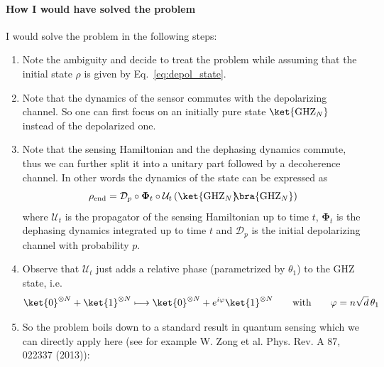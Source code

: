 {\paragraph*{How I would have solved the problem}

I would solve the problem in the following steps:
\begin{enumerate}
  \item Note the ambiguity and decide to treat the problem while assuming that the initial state $\rho$ is given by Eq.~\eqref{eq:depol_state}.
  
  \item Note that the dynamics of the sensor commutes with the depolarizing channel. So one can first focus on an initially pure state $\ket{\mathrm{GHZ}_N}$ instead of the depolarized one.
  
  \item Note that the sensing Hamiltonian and the dephasing dynamics commute, thus we can further split it into a unitary part followed by a decoherence channel. In other words the dynamics of the state can be expressed as
  \begin{equation}
    \rho_\mathrm{end} = \mathcal{D}_p\circ\mathbf{\Phi}_t\circ\mathcal{U}_t \left( \ket{\mathrm{GHZ}_N}\!\!\bra{\mathrm{GHZ}_N} \right)
  \end{equation}
  where $\mathcal{U}_t$ is the propagator of the sensing Hamiltonian up to time $t$, $\mathbf{\Phi}_t$ is the dephasing dynamics integrated up to time $t$ and $\mathcal{D}_p$ is the initial depolarizing channel with probability $p$.

  \item Observe that $\mathcal{U}_t$ just adds a relative phase (parametrized by $\theta_1$) to the GHZ state, i.e.
  \begin{equation} \label{eq:deph_ghz_phase}
    \ket{0}^{\otimes N}+\ket{1}^{\otimes N} \longmapsto
    \ket{0}^{\otimes N}+e^{i \varphi}\ket{1}^{\otimes N}
    \qquad\text{with}\qquad \varphi=n\sqrt{d}\,\theta_1
  \end{equation}

  \item So the problem boils down to a standard result in quantum sensing which we can directly apply here (see for example W. Zong et al. Phys. Rev. A 87, 022337 (2013)):
  

\end{enumerate}}
